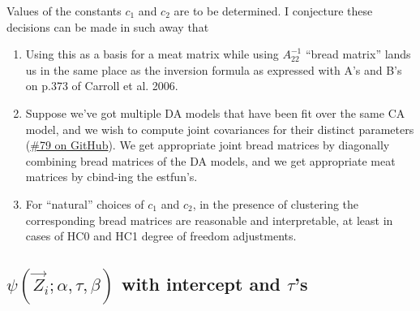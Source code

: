 \documentclass{article}
\begin{document}
Values of the constants $c_{1}$ and $c_{2}$ are to be determined.
I conjecture these decisions can be made in such away that 
\begin{enumerate}
\item Using this as a basis for a meat matrix while using
  $A_{22}^{-1}$  ``bread matrix'' lands us in the same place as the
  inversion formula as expressed with A's and B's on p.373 of Carroll
  et al. 2006.
\item Suppose we've got multiple DA models that have been fit over the
  same CA model, and we wish to compute joint covariances for their
  distinct parameters
  (\href{https://github.com/benbhansen-stats/propertee/issues/79}{\#79
    on GitHub}). We get appropriate joint bread matrices by
  diagonally combining bread matrices of the DA models, and we get
  appropriate meat matrices by cbind-ing the estfun's.
\item For ``natural'' choices of $c_{1}$ and $c_{2}$, in the
  presence of clustering the corresponding bread matrices are
  reasonable and interpretable, at least in cases of HC0 and HC1
  degree of freedom adjustments. 
\end{enumerate}

\subsection{$\psi(\vec{Z}_{i};
  \alpha, \tau, \beta)$ with intercept and $\tau$'s}
\label{sec:psit-rho_0-tau}
\end{document}
